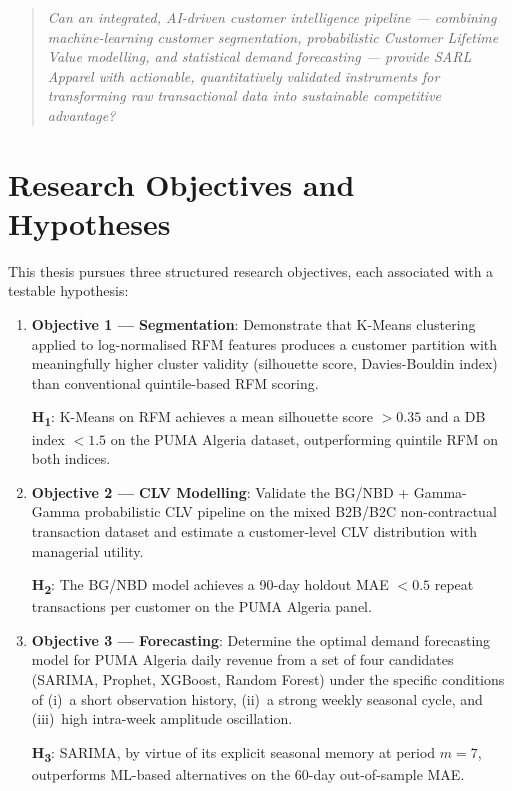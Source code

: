 \begin{quote}
\textit{Can an integrated, AI-driven customer intelligence pipeline — combining machine-learning customer segmentation, probabilistic Customer Lifetime Value modelling, and statistical demand forecasting — provide SARL Apparel with actionable, quantitatively validated instruments for transforming raw transactional data into sustainable competitive advantage?}
\end{quote}

\section*{Research Objectives and Hypotheses}

This thesis pursues three structured research objectives, each associated with a testable hypothesis:

\begin{enumerate}

    \item \textbf{Objective 1 — Segmentation}: Demonstrate that K-Means clustering applied to log-normalised RFM features produces a customer partition with meaningfully higher cluster validity (silhouette score, Davies-Bouldin index) than conventional quintile-based RFM scoring.

    \textbf{H\textsubscript{1}}: K-Means on RFM achieves a mean silhouette score $> 0.35$ and a DB index $< 1.5$ on the PUMA Algeria dataset, outperforming quintile RFM on both indices.

    \item \textbf{Objective 2 — CLV Modelling}: Validate the BG/NBD + Gamma-Gamma probabilistic CLV pipeline on the mixed B2B/B2C non-contractual transaction dataset and estimate a customer-level CLV distribution with managerial utility.

    \textbf{H\textsubscript{2}}: The BG/NBD model achieves a 90-day holdout MAE $< 0.5$ repeat transactions per customer on the PUMA Algeria panel.

    \item \textbf{Objective 3 — Forecasting}: Determine the optimal demand forecasting model for PUMA Algeria daily revenue from a set of four candidates (SARIMA, Prophet, XGBoost, Random Forest) under the specific conditions of (i)~a short observation history, (ii)~a strong weekly seasonal cycle, and (iii)~high intra-week amplitude oscillation.

    \textbf{H\textsubscript{3}}: SARIMA, by virtue of its explicit seasonal memory at period $m=7$, outperforms ML-based alternatives on the 60-day out-of-sample MAE.

\end{enumerate}

